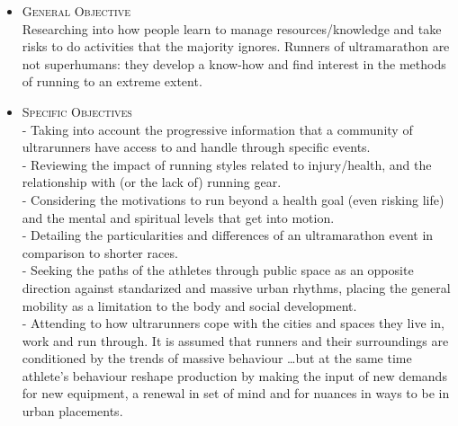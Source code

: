 \begin{itemize}
 \item \textsc{General Objective}\\
Researching into how people learn to manage resources/knowledge and take risks to do activities that the majority ignores. Runners of ultramarathon are not superhumans: they develop a know-how and find interest in the methods of running to an extreme extent.
  \item \textsc{Specific Objectives}\\
    - Taking into account the progressive information that a community of ultrarunners have access to and handle through specific events. \\
    - Reviewing the impact of running styles related to injury/health, and the relationship with (or the lack of) running gear.\\
    - Considering the motivations to run beyond a health goal (even risking life) and the mental and spiritual levels that get into motion.\\
    - Detailing the particularities and differences of an ultramarathon event in comparison to shorter races.\\ %
    - Seeking the paths of the athletes through public space as an opposite
      direction against standarized and massive urban rhythms, placing the
      general mobility as a limitation to the body and social development.\\
    - Attending to how ultrarunners cope with the cities and spaces they live in, work and run through. It is assumed that runners and their surroundings are conditioned by the trends of massive behaviour \ldots but at the same time athlete's behaviour reshape production by making the input of new demands for new equipment, a renewal in set of mind and for nuances in ways to be in urban placements.
\end{itemize}

